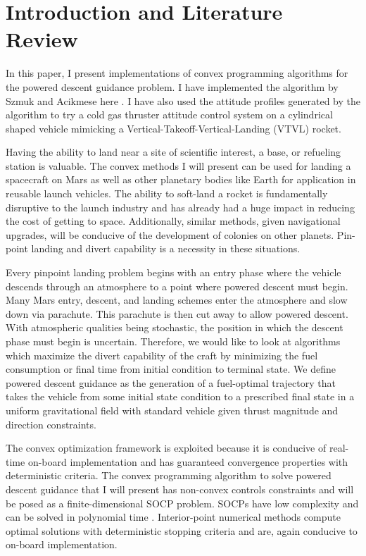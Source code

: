 \chapter{Introduction and Literature Review}
\label{introchap}

In this paper, I present implementations of convex programming algorithms for the powered descent guidance problem. I have implemented the algorithm by Szmuk and Acikmese here \cite{6dofsucc}. I have also used the attitude profiles generated by the algorithm to try a cold gas thruster attitude control system on a cylindrical shaped vehicle mimicking a Vertical-Takeoff-Vertical-Landing (VTVL) rocket.

Having the ability to land near a site of scientific interest, a base, or refueling station is valuable. The convex methods I will present can be used for landing a spacecraft on Mars as well as other planetary bodies like Earth for application in reusable launch vehicles. The ability to soft-land a rocket is fundamentally disruptive to the launch industry and has already had a huge impact in reducing the cost of getting to space. Additionally, similar methods, given navigational upgrades, will be conducive of the development of colonies on other planets. Pin-point landing and divert capability is a necessity in these situations.

Every pinpoint landing problem begins with an entry phase where the vehicle descends through an atmosphere to a point where powered descent must begin. Many Mars entry, descent, and landing schemes enter the atmosphere and slow down via parachute. This parachute is then cut away to allow powered descent. With atmospheric qualities being stochastic, the position in which the descent phase must begin is uncertain. Therefore, we would like to look at algorithms which maximize the divert capability of the craft by minimizing the fuel consumption or final time from initial condition to terminal state. We define powered descent guidance as the generation of a fuel-optimal trajectory that takes the vehicle from some initial state condition to a prescribed final state in a uniform gravitational field with standard vehicle given thrust magnitude and direction constraints.

The convex optimization framework is exploited because it is conducive of real-time on-board implementation and has guaranteed convergence properties with deterministic criteria. The convex programming algorithm to solve powered descent guidance that I will present has non-convex controls constraints and will be posed as a finite-dimensional SOCP problem. SOCPs have low complexity and can be solved in polynomial time \cite{boyd}. Interior-point numerical methods compute optimal solutions with deterministic stopping criteria and are, again conducive to on-board implementation. 


